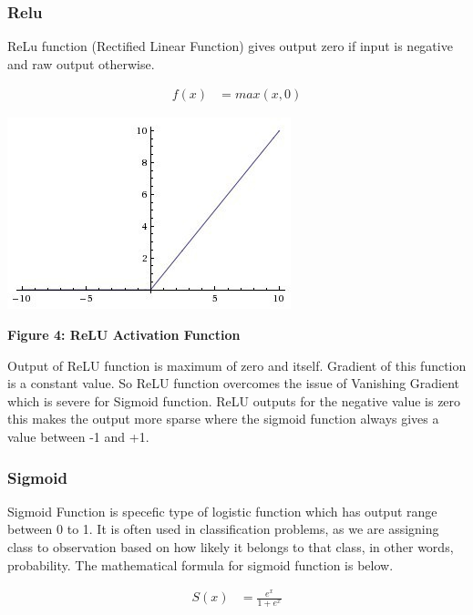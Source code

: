 \subsubsection{Relu}

ReLu function (Rectified Linear Function) gives output zero if input is
negative and raw output otherwise.

\begin{align*}
f(x)&= max(x,0)
\end{align*}

\begin{center}
\includegraphics[scale=0.35]{images/relu-activation-function.jpeg}
\label{s:ReLU-function}
\end{center}
\textbf{Figure 4: ReLU Activation Function
~\cite{hid-sp18-401-ReLU-activation-function}}

Output of ReLU function is maximum of zero and itself. Gradient of this function
is a constant value. So ReLU function overcomes the issue of Vanishing Gradient
which is severe for Sigmoid function. ReLU outputs for the negative value is
zero this makes the output more sparse where the sigmoid function always gives a
value between -1 and +1.


\subsubsection{Sigmoid}

Sigmoid Function is specefic type of logistic function which has output range
between 0 to 1. It is often used in classification problems, as we are
assigning class to observation based on how likely it belongs to that class,
in other words, probability. The mathematical formula for sigmoid function is
below.

\begin{align*}
S(x)&=\frac{e^{x}}{1+e^{x}}
\end{align*}

